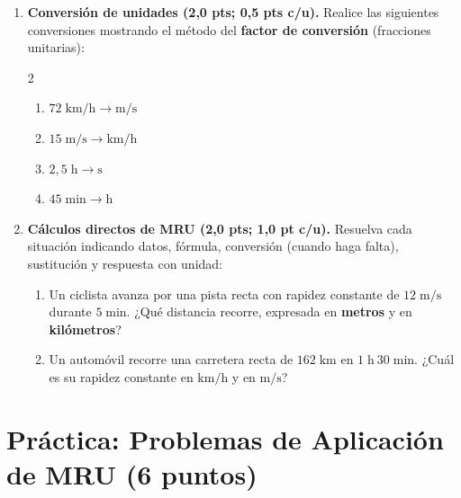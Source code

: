\documentclass[12pt, letterpaper]{article}
\begin{document}
\begin{enumerate}[leftmargin=*, label=\textbf{\arabic*.}, start=4, itemsep=0.8em]

  \item \textbf{Conversión de unidades (2,0 pts; 0,5 pts c/u).} Realice las siguientes conversiones mostrando el método del \textbf{factor de conversión} (fracciones unitarias):
        \begin{multicols}{2}
          \begin{enumerate}[label=\alph*), leftmargin=1.8em, itemsep=2.2cm]
            \item $72\;\text{km/h} \longrightarrow \text{m/s}$
            \item $15\;\text{m/s} \longrightarrow \text{km/h}$
            \item $2{,}5\;\text{h} \longrightarrow \text{s}$
            \item $45\;\text{min} \longrightarrow \text{h}$
          \end{enumerate}
        \end{multicols}
        \vspace{2.2cm}

  \item \textbf{Cálculos directos de MRU (2,0 pts; 1,0 pt c/u).} Resuelva cada situación indicando datos, fórmula, conversión (cuando haga falta), sustitución y respuesta con unidad:
        \begin{enumerate}[label=\alph*), leftmargin=1.8em, itemsep=0.8em]
          \item Un ciclista avanza por una pista recta con rapidez constante de $12\;\text{m/s}$ durante $5\;\text{min}$. ¿Qué distancia recorre, expresada en \textbf{metros} y en \textbf{kilómetros}?
                \vspace{3.5cm}
          \item Un automóvil recorre una carretera recta de $162\;\text{km}$ en $1\;\text{h}\ 30\;\text{min}$. ¿Cuál es su rapidez constante en $\text{km/h}$ y en $\text{m/s}$?
                \vspace{3.5cm}
        \end{enumerate}

\end{enumerate}

\newpage

\section{Práctica: Problemas de Aplicación de MRU (6 puntos)}
\end{document}
